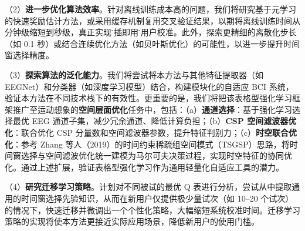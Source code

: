 （2）\textbf{进一步优化算法效率}。针对离线训练成本高的问题，我们将研究基于元学习的快速奖励估计方法，或采用缓存机制复用交叉验证结果，以期将离线训练时间从分钟级缩短到秒级，真正实现\"即插即用\"的用户校准。此外，探索更精细的离散化步长（如 0.1 秒）或结合连续优化方法（如贝叶斯优化）的可能性，以进一步提升时间窗选择精度。

（3）\textbf{探索算法的泛化能力}。我们将尝试将本方法与其他特征提取器（如 EEGNet\cite{lawhern2018eegnet}）和分类器（如深度学习模型）结合，构建模块化的自适应 BCI 系统，验证本方法在不同技术栈下的有效性。更重要的是，我们将把该表格型强化学习框架推广至运动想象的\textbf{空间层面优化}任务中，包括：（a）\textbf{通道选择}：基于强化学习选择最优 EEG 通道子集，减少冗余通道、降低计算负担\cite{mcfarland1997spatial}；（b）\textbf{CSP 空间滤波器优化}：联合优化 CSP 分量数和空间滤波器参数，提升特征判别力\cite{lotte2011regularizing}；（c）\textbf{时空联合优化}：参考 Zhang 等人（2019）的时间约束稀疏组空间模式（TSGSP）思路\cite{zhang2019temporally}，将时间窗选择与空间滤波优化统一建模为马尔可夫决策过程，实现时空特征的协同优化。通过上述扩展，验证表格型强化学习作为通用轻量化自适应工具的潜力。

（4）\textbf{研究迁移学习策略}。计划对不同被试的最优 Q 表进行分析，尝试从中提取通用的时间窗选择先验知识，从而在新用户仅提供极少量试次（如 10--20 个试次）的情况下，快速迁移并微调出一个个性化策略，大幅缩短系统校准时间。迁移学习策略的实现将使本方法更接近实际应用场景，降低新用户的使用门槛。


